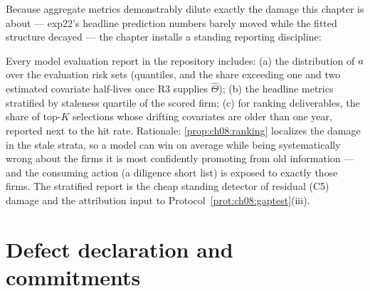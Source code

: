Because aggregate metrics demonstrably dilute exactly the damage this
chapter is about --- exp22's headline prediction numbers barely moved
while the fitted structure decayed --- the chapter installs a standing
reporting discipline:

\begin{protocol}
\label{prot:ch08:account}
Every model evaluation report in the repository includes: (a) the
distribution of $a$ over the evaluation risk sets (quantiles,
and the share exceeding one and two estimated covariate half-lives once
R3 supplies $\hat\Theta$); (b) the headline metrics stratified by
staleness quartile of the scored firm; (c) for ranking deliverables, the
share of top-$K$ selections whose drifting covariates are older than one
year, reported next to the hit rate. Rationale:
\cref{prop:ch08:ranking} localizes the damage in the stale strata, so a
model can win on average while being systematically wrong about the
firms it is most confidently promoting from old information --- and the
consuming action (a diligence short list) is exposed to exactly those
firms. The stratified report is the cheap standing detector of residual
(C5) damage and the attribution input to
Protocol~\ref{prot:ch08:gaptest}(iii).
\end{protocol}

\section{Defect declaration and commitments}\label{ch08:sec:declaration}

